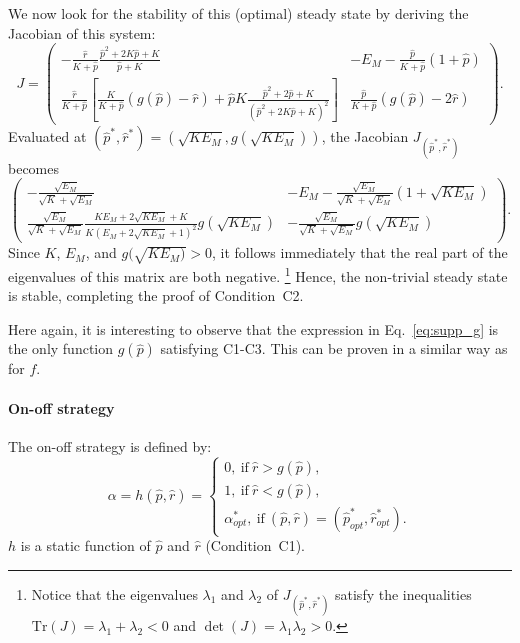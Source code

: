 We now look for the stability of this (optimal) steady state by deriving the Jacobian of this system:
\begin{equation}
\label{eq:supp_jacobian_g}
J = \left(\begin{matrix}
- \frac{\hat{r}}{K+\hat{p}} \frac{\hat{p}^2 + 2K\hat{p} + K}{\hat{p} + K} & - E_M - \frac{\hat{p}}{K+\hat{p}} (1+\hat{p}) \\
\frac{\hat{r}}{K+\hat{p}} \left[ \frac{K}{K+\hat{p}} (g(\hat{p}) - \hat{r}) + \hat{p}K\frac{\hat{p}^2 + 2\hat{p} + K}{(\hat{p}^2 + 2K\hat{p} + K)^2}\right] & \frac{\hat{p}}{K+\hat{p}} (g(\hat{p}) - 2\hat{r})
\end{matrix}\right) .
\end{equation}
Evaluated at $(\hat{p}^*, \hat{r}^*) = (\sqrt{K E_M}, g(\sqrt{K E_M}))$, the Jacobian $J_{(\hat{p}^*, \hat{r}^*)}$ becomes
\begin{equation}
\label{eq:supp_jacobian_g_eq}
\left(\begin{matrix}
- \frac{\sqrt{E_M}}{\sqrt{K}+\sqrt{E_M}} & - E_M - \frac{\sqrt{E_M}}{\sqrt{K}+\sqrt{E_M}} (1+\sqrt{K E_M}) \\
\frac{\sqrt{E_M}}{\sqrt{K}+\sqrt{E_M}}\frac{K E_M + 2 \sqrt{K E_M} + K}{K (E_M + 2 \sqrt{K E_M} + 1)^2} g(\sqrt{K E_M}) & - \frac{\sqrt{E_M}}{\sqrt{K}+\sqrt{E_M}} g(\sqrt{K E_M})
\end{matrix}\right).
\end{equation}
Since $K$, $E_M$, and $g(\sqrt{K E_M)} > 0$, it follows immediately that the real part of the eigenvalues of this matrix are both negative.
\footnote{Notice that the eigenvalues $\lambda_1$ and $\lambda_2$ of $J_{(\hat{p}^*, \hat{r}^*)}$ satisfy the inequalities $\text{Tr}(J) = \lambda_1 + \lambda_2 < 0$ and $\det(J) = \lambda_1 \lambda_2 > 0$.}
Hence, the non-trivial steady state is stable, completing the proof of Condition~C2.

Here again, it is interesting to observe that the expression in Eq.~\ref{eq:supp_g} is the only function $g(\hat{p})$ satisfying C1-C3. This can be proven in a similar way as for $f$.


\paragraph{On-off strategy}

The on-off strategy is defined by:
\begin{equation}
\alpha = h(\hat{p}, \hat{r}) = 
\begin{cases}
0, \ \textrm{if} \ \hat{r} > g(\hat{p}),\\
1, \ \textrm{if} \ \hat{r} < g(\hat{p}), \\
\alpha_{opt}^*, \ \textrm{if} \ (\hat{p},\hat{r})=(\hat{p}_{opt}^*,\hat{r}_{opt}^*).
\end{cases}
\end{equation}
$h$ is a static function of $\hat{p}$ and $\hat{r}$ (Condition~C1).

